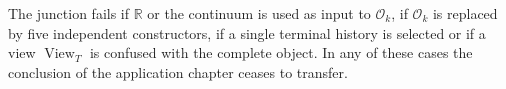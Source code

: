 \begin{falsifier}
The junction fails if \(\mathbb R\) or the continuum is used as input to
\(\mathcal O_k\), if \(\mathcal O_k\) is replaced by five independent
constructors, if a single terminal history is selected or if a view
\(\operatorname{View}_T\) is confused with the complete object. In any
of these cases the conclusion of the application chapter ceases to transfer.
\end{falsifier}
